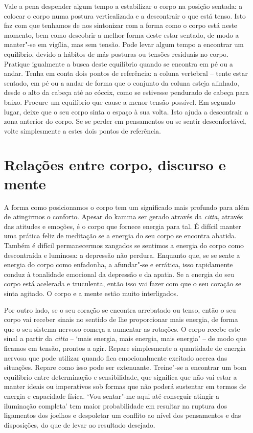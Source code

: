 \enlargethispage{\baselineskip}

Vale a pena despender algum tempo a estabilizar o corpo na posição sentada: a
colocar o corpo numa postura verticalizada e a descontrair o que está tenso.
Isto faz com que tenhamos de nos sintonizar com a forma como o corpo está neste
momento, bem como descobrir a melhor forma deste estar sentado, de modo a
manter"-se em vigília, mas sem tensão. Pode levar algum tempo a encontrar um
equilíbrio, devido a hábitos de más posturas ou tensões residuais no corpo.
Pratique igualmente a busca deste equilíbrio quando se encontra em pé ou a
andar. Tenha em conta dois pontos de referência: a coluna vertebral -- tente
estar sentado, em pé ou a andar de forma que o conjunto da coluna esteja
alinhado, desde o alto da cabeça até ao cóccix, como se estivesse pendurado de
cabeça para baixo. Procure um equilíbrio que cause a menor tensão possível. Em
segundo lugar, deixe que o seu corpo sinta o espaço à sua volta. Isto ajuda a
descontrair a zona anterior do corpo. Se se perder em pensamentos ou se sentir
desconfortável, volte simplesmente a estes dois pontos de referência.

\section{Relações entre corpo, discurso e mente}

\enlargethispage{\baselineskip}

A forma como posicionamos o corpo tem um significado mais profundo para além de
atingirmos o conforto. Apesar do kamma ser gerado através da \emph{citta},
através das atitudes e emoções, é o corpo que fornece energia para tal. É
difícil manter uma prática feliz de meditação se a energia do seu corpo se
encontra abatida. Também é difícil permanecermos zangados se sentimos a energia
do corpo como descontraída e luminosa: a depressão não perdura. Enquanto que, se
se sente a energia do corpo como enfadonha, a afundar"-se e errática, isso
rapidamente conduz à tonalidade emocional da depressão e da apatia. Se a energia
do seu corpo está acelerada e truculenta, então isso vai fazer com que o seu
coração se sinta agitado. O corpo e a mente estão muito interligados.

Por outro lado, se o seu coração se encontra arrebatado ou tenso, então o seu
corpo vai receber sinais no sentido de lhe proporcionar mais energia, de forma
que o seu sistema nervoso começa a aumentar as rotações. O corpo recebe este
sinal a partir da \emph{citta} -- `mais energia, mais energia, mais energia' --
de modo que ficamos em tensão, prontos a agir. Repare simplesmente a quantidade
de energia nervosa que pode utilizar quando fica emocionalmente excitado acerca
das situações. Repare como isso pode ser extenuante. Treine"-se a encontrar um
bom equilíbrio entre determinação e sensibilidade, que significa que não vai
estar a manter ideais ou imperativos sob formas que não poderá sustentar em
termos de energia e capacidade física. `Vou sentar"-me aqui até conseguir atingir
a iluminação completa' tem maior probabilidade em resultar na ruptura dos
ligamentos dos joelhos e despoletar um conflito ao nível dos pensamentos e das
disposições, do que de levar ao resultado desejado.

